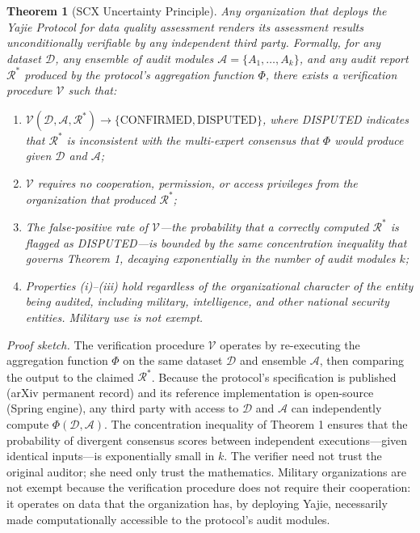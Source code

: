 \documentclass[12pt,a4paper]{ctexart}
\newtheorem{theorem}{Theorem}[section]
\theoremstyle{definition}
\theoremstyle{remark}
\begin{document}
\begin{theorem}[SCX Uncertainty Principle]
\label{thm:scx-up}
Any organization that deploys the Yajie Protocol for data quality assessment renders its assessment results \textit{unconditionally verifiable} by any independent third party. Formally, for any dataset $\mathcal{D}$, any ensemble of audit modules $\mathcal{A} = \{A_1, \ldots, A_k\}$, and any audit report $\mathcal{R}^*$ produced by the protocol's aggregation function $\Phi$, there exists a verification procedure $\mathcal{V}$ such that:

\begin{enumerate}[label=(\roman*)]
\item $\mathcal{V}(\mathcal{D}, \mathcal{A}, \mathcal{R}^*) \to \{\text{CONFIRMED}, \text{DISPUTED}\}$, where DISPUTED indicates that $\mathcal{R}^*$ is inconsistent with the multi-expert consensus that $\Phi$ would produce given $\mathcal{D}$ and $\mathcal{A}$;
\item $\mathcal{V}$ requires no cooperation, permission, or access privileges from the organization that produced $\mathcal{R}^*$;
\item The false-positive rate of $\mathcal{V}$—the probability that a correctly computed $\mathcal{R}^*$ is flagged as DISPUTED—is bounded by the same concentration inequality that governs Theorem 1, decaying exponentially in the number of audit modules $k$;
\item Properties (i)–(iii) hold regardless of the organizational character of the entity being audited, including military, intelligence, and other national security entities. Military use is not exempt.
\end{enumerate}
\end{theorem}

\textit{Proof sketch.} The verification procedure $\mathcal{V}$ operates by re-executing the aggregation function $\Phi$ on the same dataset $\mathcal{D}$ and ensemble $\mathcal{A}$, then comparing the output to the claimed $\mathcal{R}^*$. Because the protocol's specification is published (arXiv permanent record) and its reference implementation is open-source (Spring engine), any third party with access to $\mathcal{D}$ and $\mathcal{A}$ can independently compute $\Phi(\mathcal{D}, \mathcal{A})$. The concentration inequality of Theorem 1 ensures that the probability of divergent consensus scores between independent executions—given identical inputs—is exponentially small in $k$. The verifier need not trust the original auditor; she need only trust the mathematics. Military organizations are not exempt because the verification procedure does not require their cooperation: it operates on data that the organization has, by deploying Yajie, necessarily made computationally accessible to the protocol's audit modules.
\end{document}
